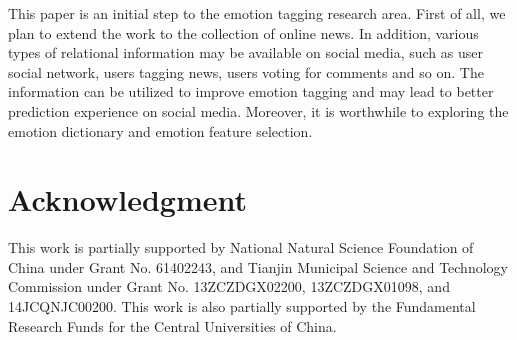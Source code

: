 \documentclass{IEEEtran}
\begin{document}
This paper is an initial step to the emotion tagging research area. First of all, we plan to extend the work to the collection of online news. In addition, various types of relational information may be available on social media, such as user social network, users tagging news, users voting for comments and so on. The information can be utilized to improve emotion tagging and may lead to better prediction experience on social media. Moreover, it is worthwhile to exploring the emotion dictionary and emotion feature selection.

\section{Acknowledgment}
This work is partially supported by National Natural Science Foundation of China under Grant No. 61402243, and Tianjin Municipal Science and Technology Commission under Grant No. 13ZCZDGX02200, 13ZCZDGX01098, and 14JCQNJC00200. This work is also partially supported by the Fundamental Research Funds for the Central Universities of China.

\scriptsize


\end{document}
